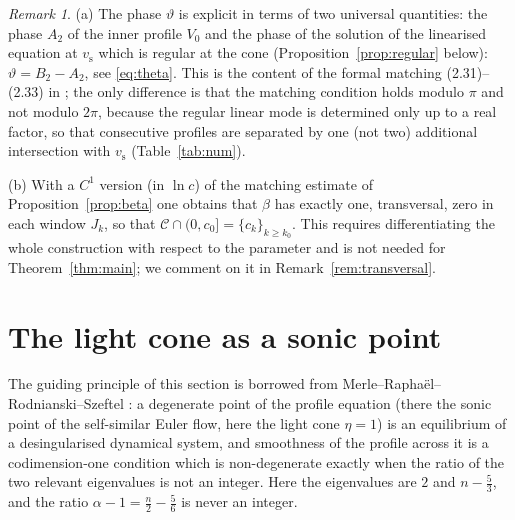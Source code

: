 \documentclass[11pt,a4paper]{amsart}
\theoremstyle{definition}
\theoremstyle{remark}
\newtheorem{remark}[theorem]{Remark}
\newcommand{\vs}{v_{\mathrm{s}}}
\begin{document}
\begin{remark}
(a) The phase $\vartheta$ is explicit in terms of two universal quantities: the phase $A_2$ of the inner profile $V_0$ and the phase of the solution of the linearised equation at $\vs$ which is regular at the cone (Proposition~\ref{prop:regular} below): $\vartheta=B_2-A_2$, see \eqref{eq:theta}.  This is the content of the formal matching (2.31)--(2.33) in \cite{GHL22}; the only difference is that the matching condition holds modulo $\pi$ and not modulo $2\pi$, because the regular linear mode is determined only up to a real factor, so that consecutive profiles are separated by one (not two) additional intersection with $\vs$ (Table~\ref{tab:num}).

(b) With a $C^1$ version (in $\ln c$) of the matching estimate of Proposition~\ref{prop:beta} one obtains that $\beta$ has exactly one, transversal, zero in each window $J_k$, so that $\mathcal C\cap(0,c_0]=\{c_k\}_{k\ge k_0}$.  This requires differentiating the whole construction with respect to the parameter and is not needed for Theorem~\ref{thm:main}; we comment on it in Remark~\ref{rem:transversal}.
\end{remark}

\section{The light cone as a sonic point}\label{sec:cone}

The guiding principle of this section is borrowed from Merle--Rapha\"el--Rodnianski--Szeftel \cite{MRRS22a,MRRS22b}: a degenerate point of the profile equation (there the sonic point of the self-similar Euler flow, here the light cone $\eta=1$) is an equilibrium of a desingularised dynamical system, and smoothness of the profile across it is a codimension-one condition which is non-degenerate exactly when the ratio of the two relevant eigenvalues is not an integer.  Here the eigenvalues are $2$ and $n-\frac53$, and the ratio $\alpha-1=\frac n2-\frac56$ is never an integer.
\end{document}
